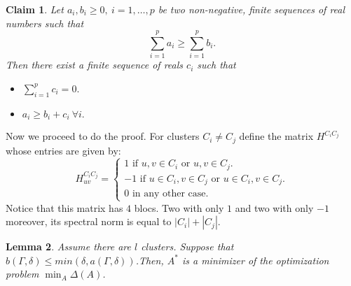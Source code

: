 \documentclass[12pt]{amsart}
\newtheorem{lemma}{Lemma}[section]
\newtheorem{claim}[lemma]{Claim}
\theoremstyle{remark}
\begin{document}
\begin{claim}
Let $a_i,b_i \geq 0, \ i = 1,\dots,p$ be two non-negative, finite sequences of real numbers such that
\[
\sum_{i=1}^{p}a_i \geq \sum_{i=1}^{p}b_i.
\]
Then there exist a finite sequence of reals $c_i$ such that
\begin{itemize}
\item $\sum_{i=1}^p c_i=0.$
\item $a_i \geq b_i+c_i \  \forall i.$
\end{itemize}
\end{claim}


Now we proceed to do the proof. For  clusters $C_i\neq C_j$ define the matrix $H^{C_iC_j}$ whose entries are given by: 
\[
H^{C_iC_j}_{uv}= 
\begin{cases}
1 \text{ if } u,v \in C_i \text{ or } u,v \in C_j. \\
-1 \text{ if } u \in C_i, v \in C_j \text{ or } u \in C_i, v\in C_j. \\
0 \text{ in any other case.}
\end{cases}
\]
Notice that this matrix has $4$ blocs. Two with only $1$ and two with only $-1$ moreover, its spectral norm is equal to $|C_i|+|C_j|$.

\begin{lemma}
Assume there are $l$ clusters. Suppose that $ b(\Gamma,\delta) \leq min(\delta,a(\Gamma,\delta))$.Then,
$A^*$ is a minimizer of the optimization problem $\min_A\Delta(A)$. 
\end{lemma}
\end{document}

